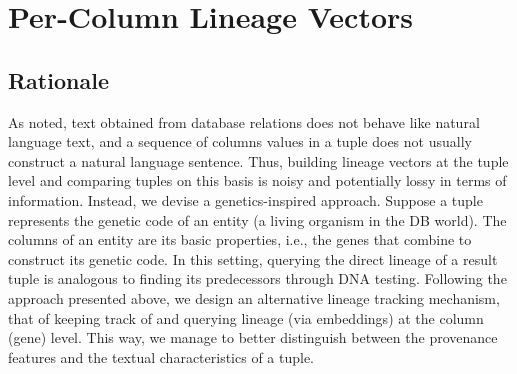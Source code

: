 \chapter{Per-Column Lineage Vectors}
\label{chap:per_column_lineage_vectors}


\section{Rationale} As noted, text obtained from database relations does not behave like natural language text, and a sequence of columns values in a tuple does not usually construct a natural language sentence. Thus, building lineage vectors at the tuple level and comparing tuples on this basis is noisy and potentially lossy in terms of information. Instead, we devise a genetics-inspired approach. Suppose a tuple represents the genetic code of an entity (a living organism in the DB world). The columns of an entity are its basic properties, i.e., the genes that combine to construct its genetic code. In this setting, querying the direct lineage of a result tuple is analogous to finding its predecessors through DNA testing. Following the approach presented above, we design an alternative lineage tracking mechanism, that of keeping track of and querying lineage (via embeddings) at the column (gene) level. This way, we manage to better distinguish between the provenance features and the textual characteristics of a tuple.\\ 

